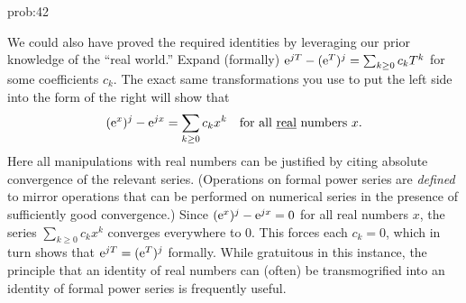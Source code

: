 \begin{sol}{prob:42}
\begin{rmk}

We could also have proved the required identities by leveraging our prior knowledge of the ``real world.''
Expand (formally) $\mathrm{e}^{jT} - (\mathrm{e}^{T})^j = \sum_{k \ge 0} c_k T^k$ for some coefficients $c_k$. The exact same transformations you use to put the left side into the form of the right will show that
\[ (\mathrm{e}^{x})^j - \mathrm{e}^{jx} = \sum_{k\ge 0} c_k x^k \quad\text{for all \underline{real} numbers $x$}. \]
Here all manipulations with real numbers can be justified by citing absolute convergence of the relevant series. (Operations on formal power series are \emph{defined} to mirror operations that can be performed on numerical series in the presence of sufficiently good convergence.) Since $(\mathrm{e}^{x})^j - \mathrm{e}^{jx}=0$ for all real numbers $x$, the series $\sum_{k\ge 0} c_k x^k$ converges everywhere to $0$. This forces each $c_k=0$, which in turn shows that $\mathrm{e}^{jT} = (\mathrm{e}^{T})^j$ formally. While gratuitous in this instance, the principle that an identity of real numbers can (often) be transmogrified into an identity of formal power series is frequently useful.
\end{rmk}
\end{sol}

